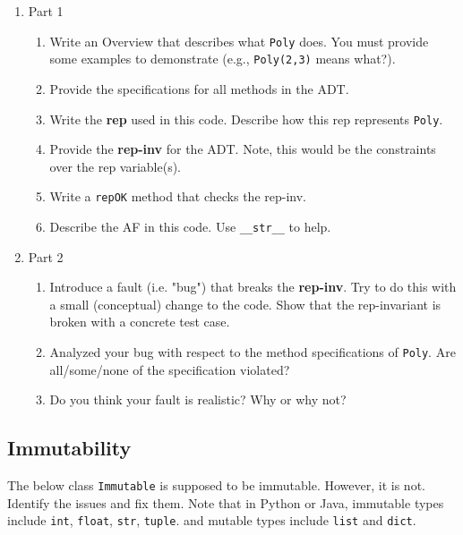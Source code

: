 \documentclass[oneside,11pt,dvipsnames]{book}
\newcommand{\code}[1]{\texttt{#1}}
\begin{document}
\begin{enumerate}
        \item Part 1
\begin{enumerate}
\item Write an Overview that describes what \code{Poly} does. You must provide some examples to demonstrate (e.g., \code{Poly(2,3)} means what?).
\item Provide the specifications for all methods in the ADT. 
\item Write the \textbf{rep} used in this code.  Describe how this rep represents \code{Poly}.
\item Provide the \textbf{rep-inv} for the ADT. Note, this would be the constraints over the rep variable(s).
\item Write a \code{repOK} method that checks the rep-inv.
\item Describe the AF in this code. Use \code{\_\_str\_\_} to help.
\end{enumerate}

        \item Part 2
\begin{enumerate}
        \item Introduce a fault (i.e. "bug") that breaks the \textbf{rep-inv}. Try to do this with a small (conceptual) change to the code. Show that the rep-invariant is broken with a concrete test case.
        \item Analyzed your bug with respect to the method specifications of \code{Poly}. Are all/some/none of the specification violated?
        \item Do you think your fault is realistic? Why or why not?
\end{enumerate}
        
\end{enumerate}


\subsection{Immutability}

The below class \code{Immutable} is supposed to be immutable. However, it is not. Identify the issues and fix them.  Note that in Python or Java, immutable types include \code{int}, \code{float}, \code{str}, \code{tuple}. and mutable types include \code{list} and \code{dict}. 
\end{document}
